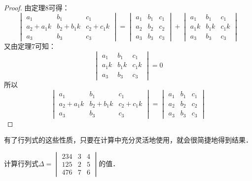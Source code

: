 \begin{proof}
    由定理8可得：
\[\begin{vmatrix}
    a_1&b_1&c_1\\a_2+a_1k&b_2+b_1k&c_2+c_1k\\a_3&b_3&c_3
\end{vmatrix}=\begin{vmatrix}
    a_1&b_1&c_1\\a_2&b_2&c_2\\a_3&b_3&c_3
\end{vmatrix}+\begin{vmatrix}
    a_1&b_1&c_1\\a_1k&b_1k&c_1k\\a_3&b_3&c_3
\end{vmatrix}\]
又由定理7可知：
\[\begin{vmatrix}
    a_1&b_1&c_1\\a_1k&b_1k&c_1k\\a_3&b_3&c_3
\end{vmatrix}=0\]
所以
\[\begin{vmatrix}
    a_1&b_1&c_1\\a_2+a_1k&b_2+b_1k&c_2+c_1k\\a_3&b_3&c_3
\end{vmatrix}=\begin{vmatrix}
    a_1&b_1&c_1\\a_2&b_2&c_2\\a_3&b_3&c_3
\end{vmatrix}\]
\end{proof}



有了行列式的这些性质，只要在计算中充分灵活地使用，就会很简捷地得到结果．

\begin{example}
    计算行列式$\Delta=\begin{vmatrix}
        234&3&4\\
        125&2&5\\
        476&7&6
    \end{vmatrix}$的值．
\end{example}


